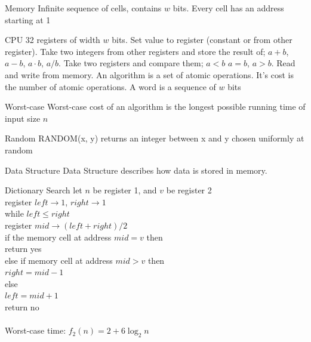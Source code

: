 \documentclass{lecture}
\begin{document}
\begin{landscape}


\begin{multicols}{2}

    \begin{note}{Memory}
        Infinite sequence of cells, contains $w$ bits. Every cell has an address starting at 1
    \end{note}
    \vfill
    \begin{note}{CPU}
        32 registers of width $w$ bits.
        Set value to register (constant or from other register). Take two integers from other registers and store the result of; $a+b$, $a-b$, $a\cdot b$, $a/b$. Take two registers and compare them; $a<b$ $a=b$, $a>b$. Read and write from memory.
        An algorithm is a set of atomic operations. It's cost is the number of atomic operations. A word is a sequence of $w$ bits
    \end{note}
    \vfill

    \begin{note}{Worst-case}
        Worst-case cost of an algorithm is the longest possible running time of input size $n$
    \end{note}
    \vfill
    \begin{note}{Random}
        RANDOM(x, y) returns an integer between x and y chosen uniformly at random
    \end{note}
    \vfill
    \begin{note}{Data Structure}
        Data Structure describes how data is stored in memory.
    \end{note}
    \vfill
    \begin{note}{Dictionary Search}
        let $n$ be register 1, and $v$ be register 2\\
        register $left\rightarrow 1$, $right\rightarrow1$\\
        while $left\leq right$\\
        \indent register $mid\rightarrow(left+right)/2$\\
        \indent if the memory cell at address $mid=v$ then\\
        \indent\indent return yes\\
        \indent else if memory cell at address $mid>v$ then\\
        \indent\indent $right=mid-1$\\
        \indent else\\
        \indent\indent $left=mid+1$\\
        return no\\\\
        Worst-case time: $f_2(n)=2+6\log_2n$
    \end{note}
    \vfill


\end{multicols}
\end{landscape}
\end{document}
